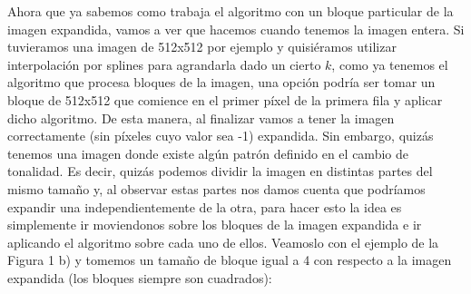 \documentclass[a4paper]{article}
\begin{document}
\par Ahora que ya sabemos como trabaja el algoritmo con un bloque particular de la imagen expandida, vamos a ver que hacemos cuando tenemos la imagen entera. Si tuvieramos una imagen de 512x512 por ejemplo y quisiéramos utilizar interpolación por splines para agrandarla dado un cierto $k$, como ya tenemos el algoritmo que procesa bloques de la imagen, una opción podría ser tomar un bloque de 512x512 que comience en el primer píxel de la primera fila y aplicar dicho algoritmo. De esta manera, al finalizar vamos a tener la imagen correctamente (sin píxeles cuyo valor sea -1) expandida. Sin embargo, quizás tenemos una imagen donde existe algún patrón definido en el cambio de tonalidad. Es decir, quizás podemos dividir la imagen en distintas partes del mismo tamaño y, al observar estas partes nos damos cuenta que podríamos expandir una independientemente de la otra, para hacer esto la idea es simplemente ir moviendonos sobre los bloques de la imagen expandida e ir aplicando el algoritmo sobre cada uno de ellos. Veamoslo con el ejemplo de la Figura 1 b) y tomemos un tamaño de bloque igual a 4 con respecto a la imagen expandida (los bloques siempre son cuadrados):
\end{document}
